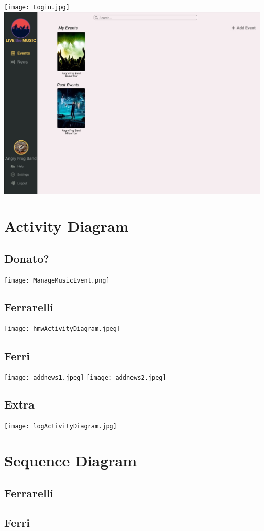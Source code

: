 \documentclass[11pt,a4paper]{article}
\begin{document}
\texttt{[image: Login.jpg]}
\includegraphics[scale=0.75]{AddEvent.jpg}
\section{Activity Diagram}
\subsection{Donato?}
\texttt{[image: ManageMusicEvent.png]}
\subsection{Ferrarelli}
\texttt{[image: hmwActivityDiagram.jpeg]}
\subsection{Ferri}
\texttt{[image: addnews1.jpeg]}
\texttt{[image: addnews2.jpeg]}
\subsection{Extra}
\texttt{[image: logActivityDiagram.jpg]}
\section{Sequence Diagram}
\subsection{Ferrarelli}
\subsection{Ferri}
\end{document}
